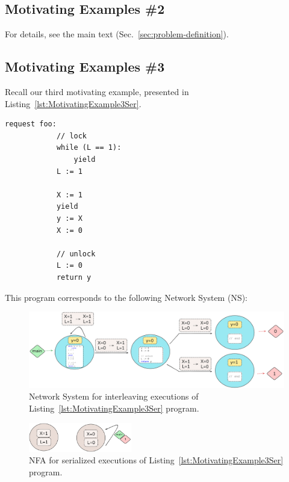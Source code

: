 %

\subsection{Motivating Examples \#2}
\label{appendix:subsec::Ex1B:NS}

For details, see the main text (Sec.~\ref{sec:problem-definition}).


\subsection{Motivating Examples \#3}
\label{appendix:subsec:Ex1C:NS}

Recall our third motivating example, presented in Listing~\ref{lst:MotivatingExample3Ser}.

\begin{minipage}[t]{0.3\textwidth}
	\begin{lstlisting}[caption={With yield and lock (serializable)}]
		request foo: 
			// lock
			while (L == 1): 
				yield
			L := 1 
		
			X := 1
			yield
			y := X 
			X := 0
		
			// unlock    
			L := 0
			return y 
	\end{lstlisting}
\end{minipage}

This program corresponds to the following Network System (NS):

\begin{figure}[htbp]
	\centering
	\includegraphics[width=1.1\textwidth]{plots/code_3_NS.png}
	\caption{Network System for interleaving executions of Listing~\ref{lst:MotivatingExample3Ser} program.}
	\label{fig:code3ExampleNS}
\end{figure}


\begin{figure}[htbp]
	\centering
	\includegraphics[width=0.4\textwidth]{plots/code_3_NFA.png}
	\caption{NFA for serialized executions of Listing~\ref{lst:MotivatingExample3Ser} program.}
	\label{fig:code3ExampleNFA}
\end{figure}



